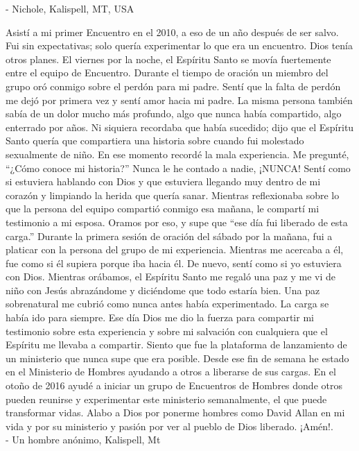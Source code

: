 \documentclass[twoside, 12pt]{book}
\begin{document}
- Nichole, Kalispell, MT, USA
\clearpage

Asistí a mi primer Encuentro en el 2010, a eso de un año después de ser salvo.  Fui sin expectativas; solo quería experimentar lo que era un encuentro.  Dios tenía otros planes.  El viernes por la noche, el Espíritu Santo se movía fuertemente entre el equipo de Encuentro.  Durante el tiempo de oración un miembro del grupo oró conmigo sobre el perdón para mi padre.  Sentí que la falta de perdón me dejó por primera vez y sentí amor hacia mi padre. La misma persona también sabía de un dolor mucho más profundo, algo que nunca había compartido, algo enterrado por años. Ni siquiera recordaba que había sucedido; dijo que el Espíritu Santo quería que compartiera una historia sobre cuando fui molestado sexualmente de niño. En ese momento recordé la mala experiencia.  Me pregunté, “¿Cómo conoce mi historia?”  Nunca le he contado a nadie, ¡NUNCA! Sentí como si estuviera hablando con Dios y que estuviera llegando muy dentro de mi corazón y limpiando la herida que quería sanar.  Mientras reflexionaba sobre lo que la persona del equipo compartió conmigo esa mañana, le compartí mi testimonio a mi esposa.  Oramos por eso, y supe que “ese día fui liberado de esta carga.”  Durante la primera sesión de oración del sábado por la mañana, fui a platicar con la persona del grupo de mi experiencia.  Mientras me acercaba a él, fue como si él supiera porque iba hacia él.  De nuevo, sentí como si yo estuviera con Dios.  Mientras orábamos, el Espíritu Santo me regaló una paz y me vi de niño con Jesús abrazándome y diciéndome que todo estaría bien.  Una paz sobrenatural me cubrió como nunca antes había experimentado. La carga se había ido para siempre. Ese día Dios me dio la fuerza para compartir mi testimonio sobre esta experiencia y sobre mi salvación con cualquiera que el Espíritu me llevaba a compartir. Siento que fue la plataforma de lanzamiento de un ministerio que nunca supe que era posible. Desde ese fin de semana he estado en el Ministerio de Hombres ayudando a otros a liberarse de sus cargas. En el otoño de 2016 ayudé a iniciar un grupo de Encuentros de Hombres donde otros pueden reunirse y experimentar este ministerio semanalmente, el que puede transformar vidas. Alabo a Dios por ponerme hombres como David Allan en mi vida y por su ministerio y pasión por ver al pueblo de Dios liberado. ¡Amén!. \\

- Un hombre anónimo, Kalispell, Mt
\clearpage
\end{document}
